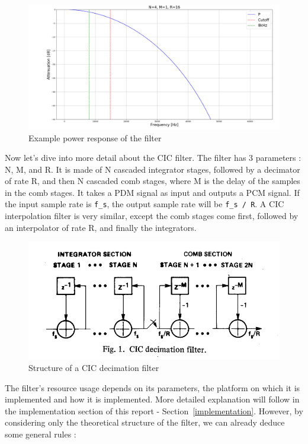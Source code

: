 \documentclass[]{report}
\begin{document}
\begin{figure}
\centering
\includegraphics[width=0.9\linewidth]{Pictures/CIC_power_resp.png}
\caption{Example power response of the filter}
\end{figure}

Now let's dive into more detail about the CIC filter. The filter has 3 parameters : N, M, and R. It is made of N cascaded integrator stages, followed by a decimator of rate R, and then N cascaded comb stages, where M is the delay of the samples in the comb stages. It takes a PDM signal as input and outputs a PCM signal. If the input sample rate is \texttt{f\_s}, the output sample rate will be \texttt{f\_s / R}. A CIC interpolation filter is very similar, except the comb stages come first, followed by an interpolator of rate R, and finally the integrators.

\begin{figure}[h]
\centering
\includegraphics[width=0.9\linewidth]{Pictures/CIC_structure.png}
\caption{Structure of a CIC decimation filter}
\end{figure}

The filter's resource usage depends on its parameters, the platform on which it is implemented and how it is implemented. More detailed explanation will follow in the implementation section of this report - Section~\ref{implementation}. However, by considering only the theoretical structure of the filter, we can already deduce some general rules :
\end{document}
